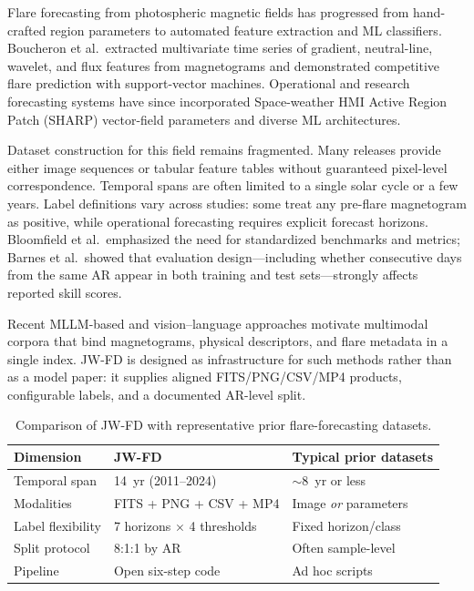 \documentclass[]{spie}
\begin{document}
Flare forecasting from photospheric magnetic fields has progressed from hand-crafted region parameters to automated feature extraction and ML classifiers.\cite{Boucheron2015,Bobra2014} Boucheron et al.\ extracted multivariate time series of gradient, neutral-line, wavelet, and flux features from magnetograms and demonstrated competitive flare prediction with support-vector machines.\cite{Boucheron2015} Operational and research forecasting systems have since incorporated Space-weather HMI Active Region Patch (SHARP) vector-field parameters and diverse ML architectures.\cite{Barnes2016,Leka2019}

Dataset construction for this field remains fragmented. Many releases provide either image sequences or tabular feature tables without guaranteed pixel-level correspondence. Temporal spans are often limited to a single solar cycle or a few years. Label definitions vary across studies: some treat any pre-flare magnetogram as positive, while operational forecasting requires explicit forecast horizons. Bloomfield et al.\ emphasized the need for standardized benchmarks and metrics;\cite{Bloomfield2012} Barnes et al.\ showed that evaluation design---including whether consecutive days from the same AR appear in both training and test sets---strongly affects reported skill scores.\cite{Barnes2016,Leka2019}

Recent MLLM-based and vision--language approaches motivate multimodal corpora that bind magnetograms, physical descriptors, and flare metadata in a single index.\cite{Shao2025jwflare,Shao2026jwvl,Shao2025review} JW-FD is designed as infrastructure for such methods rather than as a model paper: it supplies aligned FITS/PNG/CSV/MP4 products, configurable labels, and a documented AR-level split.

\begin{table}[t]
\caption{Comparison of JW-FD with representative prior flare-forecasting datasets.}
\label{tab:comparison}
\centering
\small
\begin{tabular}{@{}p{2.6cm}p{3.8cm}p{3.8cm}@{}}
\toprule
Dimension & JW-FD & Typical prior datasets \\
\midrule
Temporal span & 14~yr (2011--2024) & $\sim$8~yr or less \\
Modalities & FITS + PNG + CSV + MP4 & Image \emph{or} parameters \\
Label flexibility & 7 horizons $\times$ 4 thresholds & Fixed horizon/class \\
Split protocol & 8:1:1 by AR & Often sample-level \\
Pipeline & Open six-step code & Ad hoc scripts \\
\bottomrule
\end{tabular}
\end{table}
\end{document}
